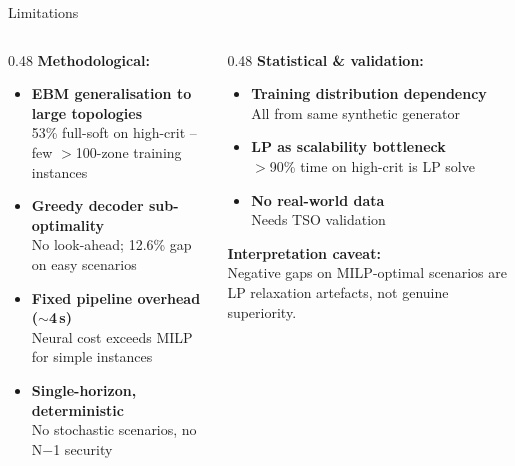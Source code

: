\documentclass[aspectratio=169, 10pt]{beamer}
\begin{document}
\begin{frame}{Limitations}
\hypertarget{main:limits}{}
\begin{columns}[T]
\begin{column}{0.48\textwidth}
\textbf{Methodological:}
\begin{itemize}
  \item[\textbf{L1}] \textbf{EBM generalisation to large topologies}\\{\scriptsize 53\% full-soft on high-crit -- few $>$100-zone training instances}
  \item[\textbf{L2}] \textbf{Greedy decoder sub-optimality}\\{\scriptsize No look-ahead; 12.6\% gap on easy scenarios}
  \item[\textbf{L3}] \textbf{Fixed pipeline overhead ($\sim$4\,s)}\\{\scriptsize Neural cost exceeds MILP for simple instances}
  \item[\textbf{L4}] \textbf{Single-horizon, deterministic}\\{\scriptsize No stochastic scenarios, no N$-$1 security}
\end{itemize}
\end{column}
\begin{column}{0.48\textwidth}
\textbf{Statistical \& validation:}
\begin{itemize}
  \item[\textbf{L5}] \textbf{Training distribution dependency}\\{\scriptsize All from same synthetic generator}
  \item[\textbf{L6}] \textbf{LP as scalability bottleneck}\\{\scriptsize $>$90\% time on high-crit is LP solve}
  \item[\textbf{L7}] \textbf{No real-world data}\\{\scriptsize Needs TSO validation}
\end{itemize}
\vspace{0.4em}
\textbf{Interpretation caveat:}\\
{\scriptsize Negative gaps on MILP-optimal scenarios are LP relaxation artefacts, not genuine superiority.}
\end{column}
\end{columns}
\end{frame}
\end{document}
